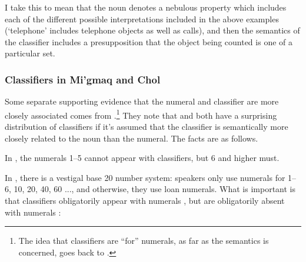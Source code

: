 \documentclass[output=paper
,modfonts
,nonflat]{langsci/langscibook}
\begin{document}
I take this to mean that the noun denotes a nebulous property which includes each of the different possible interpretations included in the above examples (`telephone' includes telephone objects as well as calls), and then the semantics of the classifier includes a presupposition that the object being counted is one of a particular set. 

\subsubsection{Classifiers in Mi'gmaq and Chol}

Some separate supporting evidence that the numeral and classifier are more closely associated comes from \citet{BaleCoon2014}.\footnote{The idea that classifiers are ``for'' numerals, as far as the semantics is concerned, goes back to \citet{Krifka1995}.} They note that  and  both have a surprising distribution of classifiers if it's assumed that the classifier is semantically more closely related to the noun than the numeral. The facts are as follows.

In , the numerals 1--5 cannot appear with classifiers, but 6 and higher must. 

	\ea
		
		\z
	\z
	
	\ea
		
		\z
	\z 


In , there is a vestigal  base 20 number system: speakers only use  numerals for 1--6, 10, 20, 40, 60 ..., and otherwise, they use  loan numerals. What is important is that classifiers obligatorily appear with  numerals , but are obligatorily absent with  numerals :\\
\end{document}
